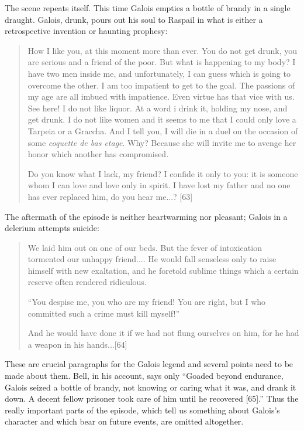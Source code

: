\documentclass[12pt]{article}
\begin{document}
The scene repeats itself. This time Galois empties a bottle of brandy in a single draught. Galois, drunk, pours out his soul to Raspail in what is either a retrospective invention or haunting prophesy:

\begin{quotation}
How I like you, at this moment more than ever. You do not get drunk, you are serious and a friend of the poor. But what is happening to my body? I have two men inside me, and unfortunately, I can guess which is going to overcome the other. I am too impatient to get to the goal. The passions of my age are all imbued with impatience. Even virtue has that vice with us. See here! I do not like liquor. At a word i drink it, holding my nose, and get drunk. I do not like women and it seems to me that I could only love a Tarpeia or a Graccha. And I tell you, I will die in a duel on the occasion of some {\it coquette de bas etage}. Why? Because she will invite me to avenge her honor which another has compromised. 

Do you know what I lack, my friend? I confide it only to you: it is someone whom I can love and love only in spirit. I have lost my father and no one has ever replaced him, do you hear me...? [63]

\end{quotation}

The aftermath of the episode is neither heartwarming nor pleasant; Galois in a delerium attempts suicide:

\begin{quotation}
We laid him out on one of our beds. But the fever of intoxication tormented our unhappy friend.... He would fall senseless only to raise himself with new exaltation, and he foretold sublime things which a certain reserve often rendered ridiculous. 

``You despise me, you who are my friend! You are right, but I who committed such a crime must kill myself!'' 

And he would have done it if we had not flung ourselves on him, for he had a weapon in his hands...[64]
\end{quotation}
These are crucial paragraphs for the Galois legend and several points need to be made about them. Bell, in his account, says only ``Goaded beyond endurance, Galois seized a bottle of brandy, not knowing or caring what it was, and drank it down. A decent fellow prisoner took care of him until he recovered [65].'' Thus the really important parts of the episode, which tell us something about Galois's character and which bear on future events, are omitted altogether.
\end{document}
